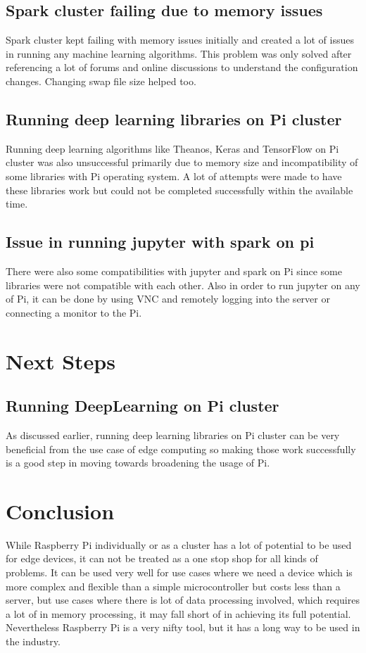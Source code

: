 \subsection{Spark cluster failing due to memory issues}
Spark cluster kept failing with memory issues initially and created a lot of issues in running any machine learning algorithms. This problem was only solved after referencing a lot of forums and online discussions to understand the configuration changes. Changing swap file size helped too.
\subsection{Running deep learning libraries on Pi cluster}
Running deep learning algorithms like Theanos, Keras and TensorFlow on Pi cluster was also unsuccessful primarily due to memory size and incompatibility of some libraries with Pi operating system. A lot of attempts were made to have these libraries work but could not be completed successfully within the available time.
\subsection{Issue in running jupyter with spark on pi}
There were also some compatibilities with jupyter and spark on Pi since some libraries were not compatible with each other. Also in order to run jupyter on any of Pi, it can be done by using VNC and remotely logging into the server or connecting a monitor to the Pi.
\section{Next Steps}
\subsection{Running DeepLearning on Pi cluster}
As discussed earlier, running deep learning libraries on Pi cluster can be very beneficial from the use case of edge computing so making those work successfully is a good step in moving towards broadening the usage of Pi.
\section{Conclusion}
While Raspberry Pi individually or as a cluster has a lot of potential to be used for edge devices, it can not be treated as a one stop shop for all kinds of problems. It can be used very well for use cases where we need a device which is more complex and flexible than a simple microcontroller but costs less than a server, but use cases where there is lot of data processing involved, which requires a lot of in memory processing, it may fall short of in achieving its full potential. Nevertheless Raspberry Pi is a very nifty tool, but it has a long way to be used in the industry.

 

